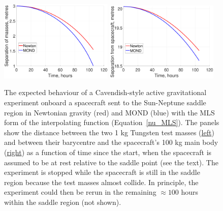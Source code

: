 \documentclass[fleqn,usenatbib,useAMS]{mnras} %
\begin{document}
\begin{figure}
	\centering
	\includegraphics[width=0.48\textwidth]{Sep_Cavendish_Neptune}
	\hfill
	\includegraphics[width=0.48\textwidth]{Sep_bc_Neptune}
	\caption{The expected behaviour of a Cavendish-style active gravitational experiment onboard a spacecraft sent to the Sun-Neptune saddle region in Newtonian gravity (red) and MOND (blue) with the MLS form of the interpolating function (Equation~\ref{nu_MLS}). The panels show the distance between the two 1 kg Tungsten test masses (\underline{left}) and between their barycentre and the spacecraft's 100 kg main body (\underline{right}) as a function of time since the start, when the spacecraft is assumed to be at rest relative to the saddle point (see the text). The experiment is stopped while the spacecraft is still in the saddle region because the test masses almost collide. In principle, the experiment could then be rerun in the remaining $\approx 100$ hours within the saddle region (not shown).}
	\label{Saddle_point_test}
\end{figure}
\end{document}
